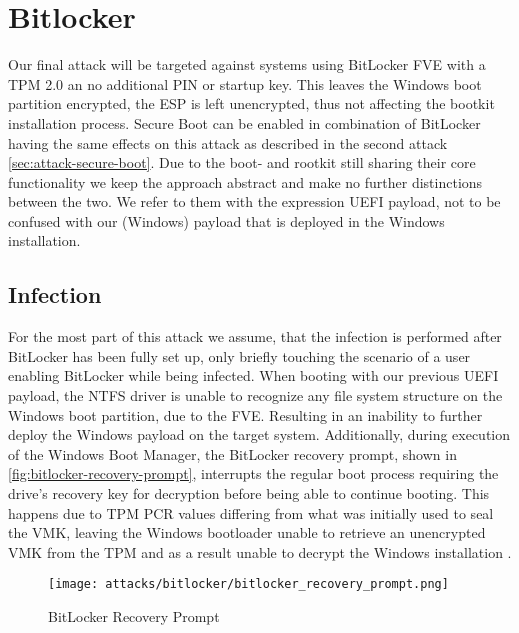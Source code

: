 \section{Bitlocker}

Our final attack will be targeted against systems using BitLocker \ac{FVE} with a \ac{TPM} 2.0 an no additional PIN or startup key.
This leaves the Windows boot partition encrypted, the \ac{ESP} is left unencrypted, thus not affecting the bootkit installation process.
Secure Boot can be enabled in combination of BitLocker having the same effects on this attack as described in the second attack \autoref{sec:attack-secure-boot}.
Due to the boot- and rootkit still sharing their core functionality we keep the approach abstract and make no further distinctions between the two.
We refer to them with the expression \ac{UEFI} payload, not to be confused with our (Windows) payload that is deployed in the Windows installation.

\subsection{Infection}

For the most part of this attack we assume, that the infection is performed after BitLocker has been fully set up, only briefly touching the scenario of a user enabling BitLocker while being infected.
When booting with our previous \ac{UEFI} payload, the \ac{NTFS} driver is unable to recognize any file system structure  on the Windows boot partition, due to the \ac{FVE}.
Resulting in an inability to further deploy the Windows payload on the target system.
Additionally, during execution of the Windows Boot Manager, the BitLocker recovery prompt, shown in \autoref{fig:bitlocker-recovery-prompt}, interrupts the regular boot process requiring the drive's recovery key for decryption before being able to continue booting.
This happens due to \ac{TPM} \ac{PCR} values differing from what was initially used to seal the \ac{VMK}, leaving the Windows bootloader unable to retrieve an unencrypted \ac{VMK} from the \ac{TPM} and as a result unable to decrypt the Windows installation \cite[12.]{windows-internals-7-part2}.

\begin{figure}[htb]
    \centering
    \texttt{[image: attacks/bitlocker/bitlocker\_recovery\_prompt.png]}
    \caption{BitLocker Recovery Prompt}
    \label{fig:bitlocker-recovery-prompt}
\end{figure}

